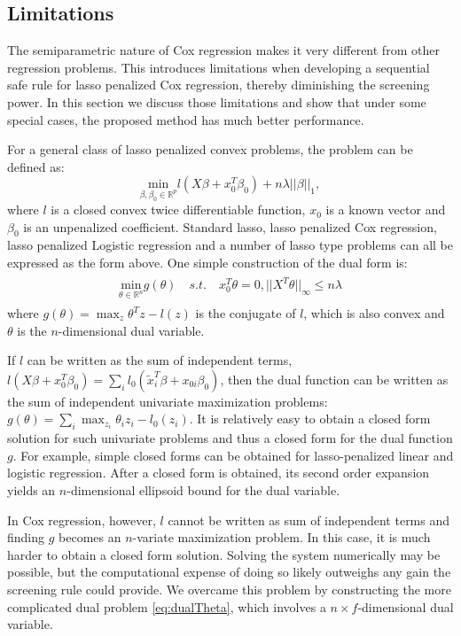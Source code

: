 \subsection{Limitations}
\label{sec:lim}

The semiparametric nature of Cox regression makes it very different from other regression problems. This introduces limitations when developing a sequential safe rule for lasso penalized Cox regression, thereby diminishing the screening power. In this section we discuss those limitations and show that under some special cases, the proposed method has much better performance.

For a general class of lasso penalized convex problems, the problem can be defined as:
\begin{equation}
    \underset{\beta,\beta_0\in \mathbb{R}^p}{\mathrm{min}}l(X\beta+x_0^T\beta_0)+n\lambda||\beta||_1,
\end{equation}
where $l$ is a closed convex twice differentiable function, $x_0$ is a known vector and $\beta_0$ is an unpenalized coefficient. Standard lasso, lasso penalized Cox regression, lasso penalized Logistic regression and a number of lasso type problems can all be expressed as the form above. One simple construction of the dual form is:
\begin{gather}
    \begin{aligned}
         \underset{\theta\in \mathbb{R}^n}{\mathrm{min}} g(\theta)\quad s.t.\quad x_0^T\theta=0,||X^T\theta||_\infty\leq n\lambda
    \end{aligned}
\end{gather}
where $g(\theta)=\max_z \theta^Tz-l(z)$ is the conjugate of $l$, which is also convex and $\theta$ is the $n$-dimensional dual variable.

If $l$ can be written as the sum of independent terms, $l(X\beta+x_0^T\beta_0)=\sum_i l_0(\tilde{x}_i^T\beta+x_{0i}\beta_0)$, then the dual function can be written as the sum of independent univariate maximization problems: $g(\theta)=\sum_i\max_{z_i} \theta_iz_i-l_0(z_i)$. It is relatively easy to obtain a closed form solution for such univariate problems and thus a closed form for the dual function $g$. For example, simple closed forms can be obtained for lasso-penalized linear and logistic regression. After a closed form is obtained, its second order expansion yields an $n$-dimensional ellipsoid bound for the dual variable.

In Cox regression, however, $l$ cannot be written as sum of independent terms and finding $g$ becomes an $n$-variate maximization problem. In this case, it is much harder to obtain a closed form solution. Solving the system numerically may be possible, but the computational expense of doing so likely outweighs any gain the screening rule could provide. We overcame this problem by constructing the more complicated dual problem \eqref{eq:dualTheta}, which involves a $n\times f$-dimensional dual variable. 

